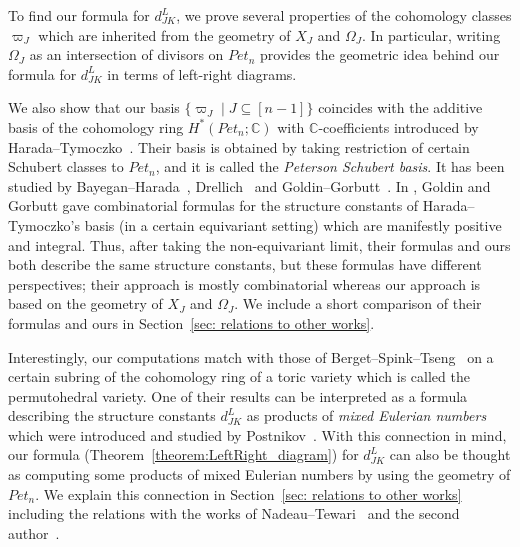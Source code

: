 To find our formula for $d_{JK}^L$, 
we prove several properties of the cohomology classes $\varpi_J$ which are inherited from the geometry of $X_J$ and $\Omega_J$.
In particular, writing $\Omega_J$ as an intersection of divisors on $Pet_{n}$ provides the geometric idea behind our formula for $d_{JK}^L$ in terms of left-right diagrams.

We also show that our basis $\{\varpi_J\mid J\subseteq[n-1]\}$ coincides with the additive basis of the cohomology ring $H^*(Pet_{n};{\mathbb C})$ with ${\mathbb C}$-coefficients introduced by Harada--Tymoczko~\cite{HaTy}. Their basis is obtained by taking restriction of certain Schubert classes to $Pet_{n}$, and it is called the \textit{Peterson Schubert basis}. It has been studied by Bayegan--Harada~\cite{BaHa}, Drellich~\cite{Dre2} and Goldin--Gorbutt~\cite{GoGo}. In \cite{GoGo}, Goldin and Gorbutt gave combinatorial formulas for the structure constants of Harada--Tymoczko's basis (in a certain equivariant setting) which are manifestly positive and integral. 
Thus, after taking the non-equivariant limit, their formulas and ours both describe the same structure constants, but these formulas have different perspectives; 
their approach is mostly combinatorial whereas our approach is based on the geometry of $X_J$ and $\Omega_J$. We include a short comparison of their formulas and ours in Section~\ref{sec: relations to other works}.

Interestingly, our computations match with those of Berget--Spink--Tseng~\cite[Sect.~7]{Berget-Spink-Tseng} on a certain subring of the cohomology ring of a toric variety which is called the permutohedral variety.
One of their results can be interpreted as a formula describing the structure constants $d_{JK}^L$ as products of \textit{mixed Eulerian numbers} which were introduced and studied by Postnikov~\cite{Postnikov09}.
With this connection in mind, our formula (Theorem~\ref{theorem:LeftRight_diagram}) for $d_{JK}^L$ can also be thought as computing some products of mixed Eulerian numbers by using the geometry of $Pet_{n}$.
We explain this connection in Section~\ref{sec: relations to other works} including the relations with the works of Nadeau--Tewari~\cite{Nadeau-Tewari} and the second author~\cite{Horiguchi21}.


